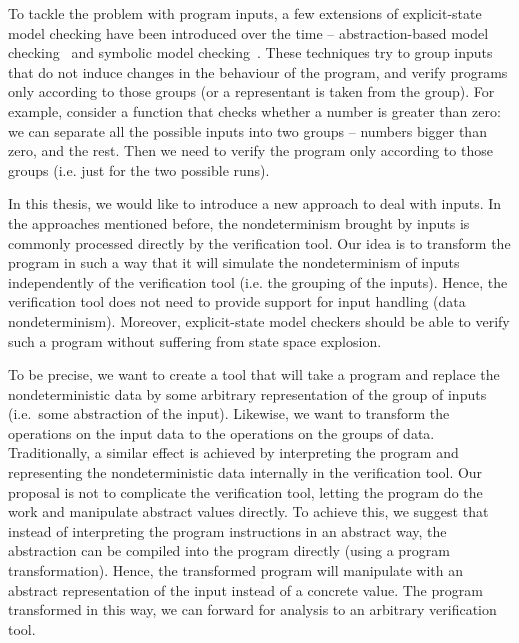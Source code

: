 To tackle the problem with program inputs, a few extensions of explicit-state
model checking have been introduced over the time -- abstraction-based model
checking~\cite{Clarke94} and symbolic model checking~\cite{Clarke96}. These
techniques try to group inputs that do not induce changes in the behaviour of
the program, and verify programs only according to those groups (or a
representant is taken from the group). For example, consider a function
that checks whether a number is greater than zero: we can separate all the
possible inputs into two groups -- numbers bigger than zero, and the rest. Then
we need to verify the program only according to those groups (i.e. just for the
two possible runs).

In this thesis, we would like to introduce a new approach to deal with inputs.
In the approaches mentioned before, the nondeterminism brought by inputs is
commonly processed directly by the verification tool. Our idea is to transform
the program in such a way that it will simulate the nondeterminism of inputs
independently of the verification tool (i.e. the grouping of the inputs). Hence,
the verification tool does not need to provide support for input
handling (data nondeterminism). Moreover, explicit-state model
checkers should be able to verify such a program without suffering
from state space explosion.

To be precise, we want to create a tool that will take a program and replace the
nondeterministic data by some arbitrary representation of the group of inputs
(i.e.~some abstraction of the input).  Likewise, we want to transform the
operations on the input data to the operations on the groups of
data. Traditionally, a
similar effect is achieved by interpreting the program and representing the
nondeterministic data internally in the verification tool. Our proposal is
not to complicate the verification tool, letting the program do the work and
manipulate abstract values directly. To achieve this, we suggest that
instead of interpreting the program instructions in an abstract way, the
abstraction can be compiled into the program directly (using a program
transformation). Hence, the transformed program will manipulate with
an abstract representation of the input instead of a concrete value.  The
program transformed in this way, we can forward for analysis to an arbitrary
verification tool.

